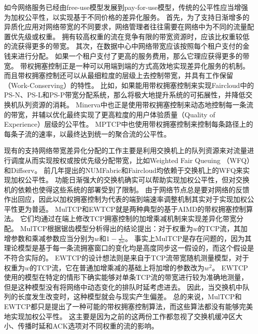 \documentclass[winfonts]{njuthesis}
\begin{document}
如今网络服务已经由free-use模型发展到pay-for-use模型，传统的公平性应当增强为加权公平性，以实现基于不同价格的差异化服务。
首先，为了支持日渐增多的异质化应用对网络带宽的不同要求，网络管理者往往需要在网络中为不同的流量配置优先级或权重\cite{Hong2013SWAN}。
拥有较高权重的流在竞争有限的带宽资源时，应该比权重较低的流获得更多的带宽。
其次，在数据中心中网络带宽应该按照每个租户支付的金钱来进行分配\cite{popa2012faircloud}。
如果一个租户支付了更高的服务费用，那么它理应获得更多的带宽。
带权拥塞控制正是一种可以用端到端的方式高效地实现差异化服务的机制。
而且带权拥塞控制还可以从最细粒度的层级上去控制带宽，并具有工作保留（Work-Conserving）的特性。
比如，如果能用带权拥塞控制来实现Faircloud\cite{popa2012faircloud}中的PS-N、PS-L和PS-P带宽分配系统，那么将极大地提升系统的可拓展性，并降低交换机队列资源的消耗。
Minerva\cite{Nathan2019wcubic}中也正是使用带权拥塞控制来动态地控制每一条流的带宽，并辅以优化最终实现了更高粒度的用户体验质量（Quality of Experience）层级的公平性。
MPTCP\cite{wischik2011design}中也使用带权拥塞控制来控制每条路径上的每条子流的速率，以最终达到统一的聚合流的公平性。

现有的支持网络带宽差异化分配的工作主要是利用交换机上的队列资源来对流量进行调度从而实现按权或按优先级分配带宽，比如Weighted Fair Queuing （WFQ）\cite{demers1989analysis}\cite{Abhay1993WFQ}和Diffserv\cite{Kathleen1998Diffserv}。
前几年提出的NUMFabric\cite{nagaraj2016numfabric}和Faircloud\cite{popa2012faircloud}均依赖于交换机上的WFQ来实现加权公平性。
功能日渐强大的交换机确实可以帮助实现加权公平性，但对交换机的依赖也使得这些系统的部署受到了限制。
由于网络节点总是要对网络的反馈作出回应，因此以加权拥塞控制为代表的端到端速率调整机制其实对于实现加权公平性更为普适。
MulTCP\cite{crowcroft1998differentiated}和EWTCP\cite{wischik2011design}就是两种典型的基于AIMD的带权拥塞控制算法。
它们均通过在端上修改TCP拥塞控制的加增乘减机制来实现差异化带宽分配。
MulTCP根据锯齿模型分析得出的结论\cite{Floyd1997Sawtooth}提出：对于权重为$w$的TCP流，其加增参数和乘减参数应当分别为$w$和$1-\frac{1}{2w}$。
事实上MulTCP是存在问题的，因为其理论模型是基于每一条流拥塞窗口的变化均是高度同步这一假设的，而这个假设是不符合实际的。
EWTCP的设计想法则是来自于TCP流带宽随机测量模型\cite{padhye1998modeling}，对于权重为$w$的TCP流，它在普通加增乘减的基础上将加增的参数改为$w^2$。
EWTCP使用的模型在特定的情形下确实能够对单条TCP流的带宽进行较为准确地测量，但是这种模型没有将网络中动态变化的排队时延考虑进去。
因此，当交换机中队列的长度发生改变时，这种模型就会与现实产生偏差。
总的来说，MulTCP和EWTCP都只是提出了一种可能的带权拥塞控制算法，而这些算法都没有能够完美地实现加权公平性。
这主要是因为之前的这两份工作\cite{crowcroft1998differentiated}\cite{wischik2011design}都忽视了交换机缓冲区大小、传播时延和ACK选项对不同权重的流的影响。
\end{document}

